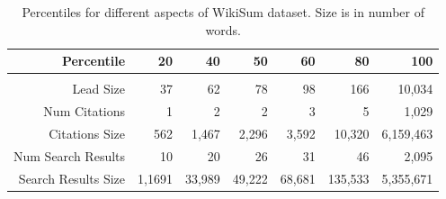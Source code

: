 \begin{table}[t]
\caption{Percentiles for different aspects of WikiSum dataset. Size is in number of words.}
\begin{center}
\begin{tabular}{rrrrrrr}
\multicolumn{1}{r}{\bf Percentile}&\multicolumn{1}{r}{\bf 20}&\multicolumn{1}{r}{\bf 40}&\multicolumn{1}{r}{\bf 50}&\multicolumn{1}{r}{\bf 60}&\multicolumn{1}{r}{\bf 80}&\multicolumn{1}{r}{\bf 100}\\ \hline \\
Lead Size	&37	&62	&78	&98	&166	&10,034 \\
Num Citations	&1	&2	&2	&3	&5	&1,029 \\
Citations Size	&562	&1,467	&2,296	&3,592	&10,320	&6,159,463 \\
Num Search Results	&10	&20	&26	&31	&46	&2,095 \\
Search Results Size	&1,1691	&33,989	&49,222	&68,681	&135,533	&5,355,671 \\
\end{tabular}
\end{center}
\label{wikisum-stats}
\end{table}
